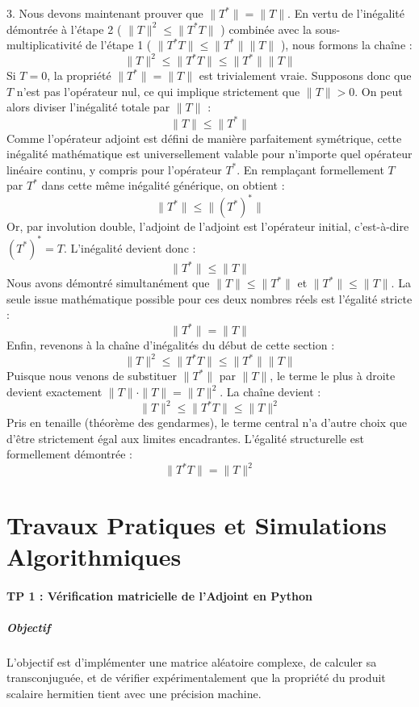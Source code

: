 \documentclass[11pt,a4paper]{article}
\begin{document}
3. Nous devons maintenant prouver que $\|T^*\| = \|T\|$.
En vertu de l'inégalité démontrée à l'étape 2 ( $\|T\|^2 \le \|T^*T\|$ ) combinée avec la sous-multiplicativité de l'étape 1 ( $\|T^*T\| \le \|T^*\|\|T\|$ ), nous formons la chaîne :
$$ \|T\|^2 \le \|T^*T\| \le \|T^*\| \|T\| $$
Si $T = 0$, la propriété $\|T^*\| = \|T\|$ est trivialement vraie.
Supposons donc que $T$ n'est pas l'opérateur nul, ce qui implique strictement que $\|T\| > 0$. On peut alors diviser l'inégalité totale par $\|T\|$ :
$$ \|T\| \le \|T^*\| $$
Comme l'opérateur adjoint est défini de manière parfaitement symétrique, cette inégalité mathématique est universellement valable pour n'importe quel opérateur linéaire continu, y compris pour l'opérateur $T^*$.
En remplaçant formellement $T$ par $T^*$ dans cette même inégalité générique, on obtient :
$$ \|T^*\| \le \|(T^*)^*\| $$
Or, par involution double, l'adjoint de l'adjoint est l'opérateur initial, c'est-à-dire $(T^*)^* = T$. L'inégalité devient donc :
$$ \|T^*\| \le \|T\| $$
Nous avons démontré simultanément que $\|T\| \le \|T^*\|$ et $\|T^*\| \le \|T\|$. La seule issue mathématique possible pour ces deux nombres réels est l'égalité stricte :
$$ \|T^*\| = \|T\| $$
Enfin, revenons à la chaîne d'inégalités du début de cette section :
$$ \|T\|^2 \le \|T^*T\| \le \|T^*\| \|T\| $$
Puisque nous venons de substituer $\|T^*\|$ par $\|T\|$, le terme le plus à droite devient exactement $\|T\| \cdot \|T\| = \|T\|^2$. La chaîne devient :
$$ \|T\|^2 \le \|T^*T\| \le \|T\|^2 $$
Pris en tenaille (théorème des gendarmes), le terme central n'a d'autre choix que d'être strictement égal aux limites encadrantes. L'égalité structurelle est formellement démontrée :
$$ \|T^*T\| = \|T\|^2 $$


\part{Travaux Pratiques et Simulations Algorithmiques}
\subsection*{TP 1 : Vérification matricielle de l'Adjoint en Python}
\subsubsection*{Objectif}
L'objectif est d'implémenter une matrice aléatoire complexe, de calculer sa transconjuguée, et de vérifier expérimentalement que la propriété du produit scalaire hermitien tient avec une précision machine.
\end{document}
